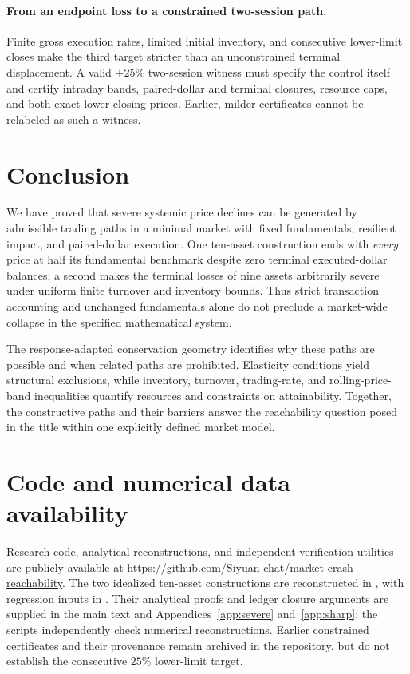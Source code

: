 \documentclass[review,hidelinks,onefignum,onetabnum]{siamonline250211}
\begin{document}
\paragraph{From an endpoint loss to a constrained two-session path.}
Finite gross execution rates, limited initial inventory, and consecutive lower-limit closes make the third target stricter than an unconstrained terminal displacement. A valid $\pm25\%$ two-session witness must specify the control itself and certify intraday bands, paired-dollar and terminal closures, resource caps, and both exact lower closing prices. Earlier, milder certificates cannot be relabeled as such a witness.

\section{Conclusion}\label{sec:conclusion}
We have proved that severe systemic price declines can be generated by admissible trading paths in a minimal market with fixed fundamentals, resilient impact, and paired-dollar execution. One ten-asset construction ends with \emph{every} price at half its fundamental benchmark despite zero terminal executed-dollar balances; a second makes the terminal losses of nine assets arbitrarily severe under uniform finite turnover and inventory bounds. Thus strict transaction accounting and unchanged fundamentals alone do not preclude a market-wide collapse in the specified mathematical system.

The response-adapted conservation geometry identifies why these paths are possible and when related paths are prohibited. Elasticity conditions yield structural exclusions, while inventory, turnover, trading-rate, and rolling-price-band inequalities quantify resources and constraints on attainability. Together, the constructive paths and their barriers answer the reachability question posed in the title within one explicitly defined market model.

\section*{Code and numerical data availability}
Research code, analytical reconstructions, and independent verification utilities are publicly available at \url{https://github.com/Siyuan-chat/market-crash-reachability}. The two idealized ten-asset constructions are reconstructed in , with regression inputs in . Their analytical proofs and ledger closure arguments are supplied in the main text and Appendices~\ref{app:severe} and~\ref{app:sharp}; the scripts independently check numerical reconstructions. Earlier constrained certificates and their provenance remain archived in the repository, but do not establish the consecutive $25\%$ lower-limit target.
\end{document}
